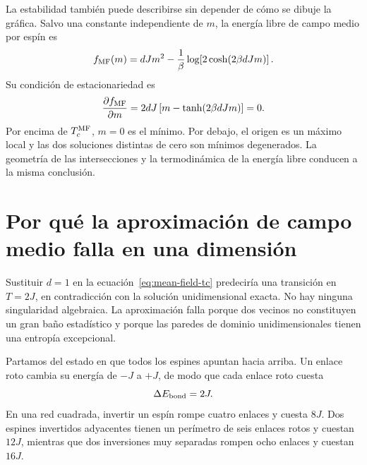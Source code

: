 La estabilidad también puede describirse sin depender de cómo se dibuje la gráfica. Salvo una constante independiente de \(m\), la energía libre de campo medio por espín es
\begin{equation}
f_{\rm MF}(m)
=dJm^2-\frac{1}{\beta}
\log\!\left[2\cosh(2\beta dJm)\right].
\label{eq:mf-free-energy}
\end{equation}
Su condición de estacionariedad es
\begin{equation}
\frac{\partial f_{\rm MF}}{\partial m}
=2dJ\left[m-\tanh(2\beta dJm)\right]=0.
\end{equation}
Por encima de \(T_c^{\rm MF}\), \(m=0\) es el mínimo. Por debajo, el origen es un máximo local y las dos soluciones distintas de cero son mínimos degenerados. La geometría de las intersecciones y la termodinámica de la energía libre conducen a la misma conclusión.

\begin{classroomqa}
\end{classroomqa}

\section{Por qué la aproximación de campo medio falla en una dimensión}

Sustituir \(d=1\) en la ecuación~\eqref{eq:mean-field-tc} predeciría una transición en \(T=2J\), en contradicción con la solución unidimensional exacta. No hay ninguna singularidad algebraica. La aproximación falla porque dos vecinos no constituyen un gran baño estadístico y porque las paredes de dominio unidimensionales tienen una entropía excepcional.

Partamos del estado en que todos los espines apuntan hacia arriba. Un enlace roto cambia su energía de \(-J\) a \(+J\), de modo que cada enlace roto cuesta
\begin{equation}
\Delta E_{\rm bond}=2J.
\end{equation}
En una red cuadrada, invertir un espín rompe cuatro enlaces y cuesta \(8J\). Dos espines invertidos adyacentes tienen un perímetro de seis enlaces rotos y cuestan \(12J\), mientras que dos inversiones muy separadas rompen ocho enlaces y cuestan \(16J\).


